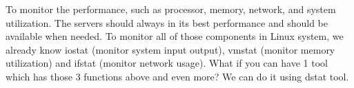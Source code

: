 To monitor the performance, such as processor, memory, network, and
system utilization. The servers should always in its best performance and should be available when needed. To monitor
all of those components in Linux system, we already know iostat (monitor system input output),
vmstat (monitor memory utilization) and ifstat (monitor network usage). What if you can have 1 tool which has
those 3 functions above and even more? We can do it using dstat tool.





%
%
%
%
%
